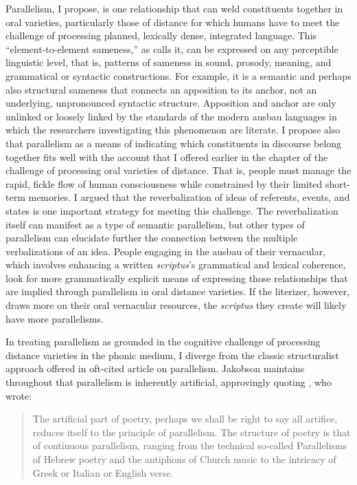 Parallelism, I propose, is one relationship that can weld constituents together in oral varieties, particularly those of distance for which humans have to meet the challenge of processing planned, lexically dense, integrated language. This “element-to-element sameness,” as \citet[208]{FrogTarkka2017} calls it, can be expressed on any perceptible linguistic level, that is, patterns of sameness in sound, prosody, meaning, and grammatical or syntactic constructions. For example, it is a semantic and perhaps also structural sameness that connects an apposition to its anchor, not an underlying, unpronounced syntactic structure. Apposition and anchor are only unlinked or loosely linked by the standards of the modern ausbau languages in which the researchers investigating this phenomenon are literate. I propose also that parallelism as a means of indicating which constituents in discourse belong together fits well with the account that I offered earlier in the chapter of the challenge of processing oral varieties of distance. That is, people must manage the rapid, fickle flow of human consciousness while constrained by their limited short-term memories. I argued that the reverbalization of ideas of referents, events, and states is one important strategy for meeting this challenge. The reverbalization itself can manifest as a type of semantic parallelism, but other types of parallelism can elucidate further the connection between the multiple verbalizations of an idea. People engaging in the ausbau of their vernacular, which involves enhancing a written \textit{scriptus}’s grammatical and lexical coherence, look for more grammatically explicit means of expressing those relationships that are implied through parallelism in oral distance varieties. If the literizer, however, draws more on their oral vernacular resources, the \textit{scriptus} they create will likely have more parallelisms.

In treating parallelism as grounded in the cognitive challenge of processing distance varieties in the phonic medium, I diverge from the classic structuralist approach offered in  oft-cited article on parallelism. Jakobson maintains throughout that parallelism is inherently artificial, approvingly quoting \citet[84]{Hopkins1959}, who wrote:

\begin{quote}
    The artificial part of poetry, perhaps we shall be right to say all artifice, reduces itself to the principle of parallelism. The structure of poetry is that of continuous parallelism, ranging from the technical so-called Parallelisms of Hebrew poetry and the antiphons of Church music to the intricacy of Greek or Italian or English verse.
\end{quote}

